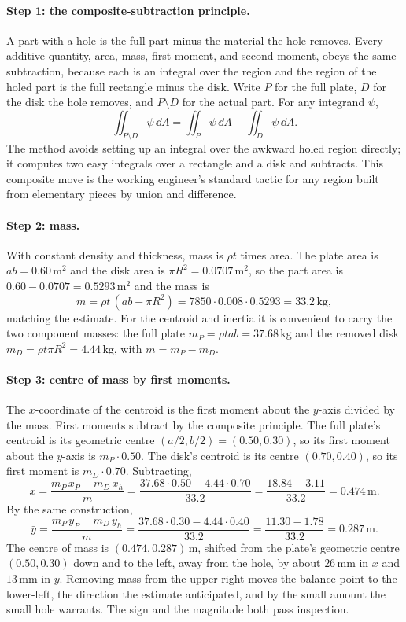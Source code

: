 \paragraph{Step 1: the composite-subtraction principle.} A part with
a hole is the full part minus the material the hole removes. Every
additive quantity, area, mass, first moment, and second moment, obeys
the same subtraction, because each is an integral over the region and
the region of the holed part is the full rectangle minus the disk.
Write $P$ for the full plate, $D$ for the disk the hole removes, and
$P \setminus D$ for the actual part. For any integrand $\psi$,
\[
\iint_{P \setminus D}\psi\,\dd A = \iint_{P}\psi\,\dd A -
\iint_{D}\psi\,\dd A.
\]
The method avoids setting up an integral over the awkward
holed region directly; it computes two easy integrals over a
rectangle and a disk and subtracts. This composite move is the
working engineer's standard tactic for any region built from
elementary pieces by union and difference.

\paragraph{Step 2: mass.} With constant density and thickness, mass
is $\rho t$ times area. The plate area is $a b = 0.60\,\si{\meter
\squared}$ and the disk area is $\pi R^{2} = 0.0707\,\si{\meter
\squared}$, so the part area is $0.60 - 0.0707 =
0.5293\,\si{\meter\squared}$ and the mass is
\[
m = \rho t\,(a b - \pi R^{2}) = 7850\cdot 0.008\cdot 0.5293
= 33.2\,\si{\kilogram},
\]
matching the estimate. For the centroid and inertia it is convenient
to carry the two component masses: the full plate $m_{P} = \rho t a b
= 37.68\,\si{\kilogram}$ and the removed disk $m_{D} = \rho t\pi R^{2}
= 4.44\,\si{\kilogram}$, with $m = m_{P} - m_{D}$.

\paragraph{Step 3: centre of mass by first moments.} The
$x$-coordinate of the centroid is the first moment about the
$y$-axis divided by the mass. First moments subtract by the composite
principle. The full plate's centroid is its geometric centre $(a/2,
b/2) = (0.50, 0.30)$, so its first moment about the $y$-axis is
$m_{P}\cdot 0.50$. The disk's centroid is its centre $(0.70, 0.40)$,
so its first moment is $m_{D}\cdot 0.70$. Subtracting,
\[
\bar{x} = \frac{m_{P}\,x_{P} - m_{D}\,x_{h}}{m}
= \frac{37.68\cdot 0.50 - 4.44\cdot 0.70}{33.2}
= \frac{18.84 - 3.11}{33.2} = 0.474\,\si{\meter}.
\]
By the same construction,
\[
\bar{y} = \frac{m_{P}\,y_{P} - m_{D}\,y_{h}}{m}
= \frac{37.68\cdot 0.30 - 4.44\cdot 0.40}{33.2}
= \frac{11.30 - 1.78}{33.2} = 0.287\,\si{\meter}.
\]
The centre of mass is $(0.474, 0.287)\,\si{\meter}$, shifted from the
plate's geometric centre $(0.50, 0.30)$ down and to the left, away
from the hole, by about $26\,\si{\milli\meter}$ in $x$ and
$13\,\si{\milli\meter}$ in $y$. Removing mass from the upper-right
moves the balance point to the lower-left, the direction the estimate
anticipated, and by the small amount the small hole warrants. The
sign and the magnitude both pass inspection.

